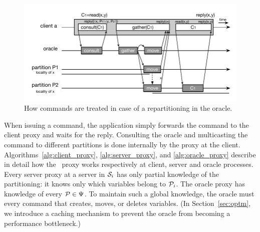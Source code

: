\begin{figure}
\begin{minipage}[b]{1\linewidth} %
\centering
      \includegraphics[width=1.0\linewidth]{figures/new-scheme}
\end{minipage}
\caption{How commands are treated in case of a repartitioning in the oracle.}
\label{fig:oracle_repartition}
\end{figure}



When issuing a command, the application simply forwards the command to the client proxy and waits for the reply.
Consulting the oracle and multicasting the command to different partitions is done internally by the proxy at the client.
Algorithms~\ref{alg:client_proxy}, \ref{alg:server_proxy}, and \ref{alg:oracle_proxy} describe in detail how the \dssmr\ proxy works respectively at client, server and oracle processes.
Every server proxy at a server in $\mathcal{S}_i$ has only partial knowledge of the partitioning: it knows only which variables belong to $\mathcal{P}_i$.
The oracle proxy has knowledge of every $\mathcal{P} \in \Psi$.
To maintain such a global knowledge, the oracle must \amdel{} every command that creates, moves, or deletes variables.
(In Section~\ref{sec:optm}, we introduce a caching mechanism to prevent the oracle from becoming a performance bottleneck.)

\clearpage






